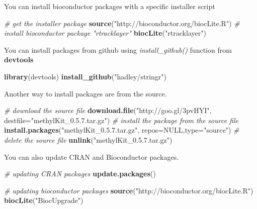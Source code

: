 \documentclass[12pt,]{krantz}
\newenvironment{Shaded}{\begin{snugshade}}{\end{snugshade}}
\newcommand{\CommentTok}[1]{\textcolor[rgb]{0.56,0.35,0.01}{\textit{#1}}}
\newcommand{\DataTypeTok}[1]{\textcolor[rgb]{0.13,0.29,0.53}{#1}}
\newcommand{\KeywordTok}[1]{\textcolor[rgb]{0.13,0.29,0.53}{\textbf{#1}}}
\newcommand{\NormalTok}[1]{#1}
\newcommand{\OtherTok}[1]{\textcolor[rgb]{0.56,0.35,0.01}{#1}}
\newcommand{\StringTok}[1]{\textcolor[rgb]{0.31,0.60,0.02}{#1}}
\theoremstyle{definition}
\theoremstyle{definition}
\theoremstyle{definition}
\theoremstyle{remark}
\begin{document}
You can install bioconductor packages with a specific installer script

\begin{Shaded}
\begin{Highlighting}[]
\CommentTok{# get the installer package}
\KeywordTok{source}\NormalTok{(}\StringTok{"http://bioconductor.org/biocLite.R"}\NormalTok{)}
\CommentTok{# install bioconductor package "rtracklayer"}
\KeywordTok{biocLite}\NormalTok{(}\StringTok{"rtracklayer"}\NormalTok{)}
\end{Highlighting}
\end{Shaded}

You can install packages from github using \emph{install\_github()}
function from \textbf{devtools}

\begin{Shaded}
\begin{Highlighting}[]
\KeywordTok{library}\NormalTok{(devtools)}
\KeywordTok{install_github}\NormalTok{(}\StringTok{"hadley/stringr"}\NormalTok{)}
\end{Highlighting}
\end{Shaded}

Another way to install packages are from the source.

\begin{Shaded}
\begin{Highlighting}[]
\CommentTok{# download the source file}
\KeywordTok{download.file}\NormalTok{(}\StringTok{"http://goo.gl/3pvHYI"}\NormalTok{,}
               \DataTypeTok{destfile=}\StringTok{"methylKit_0.5.7.tar.gz"}\NormalTok{)}
\CommentTok{# install the package from the source file}
\KeywordTok{install.packages}\NormalTok{(}\StringTok{"methylKit_0.5.7.tar.gz"}\NormalTok{,}
                 \DataTypeTok{repos=}\OtherTok{NULL}\NormalTok{,}\DataTypeTok{type=}\StringTok{"source"}\NormalTok{)}
\CommentTok{# delete the source file}
\KeywordTok{unlink}\NormalTok{(}\StringTok{"methylKit_0.5.7.tar.gz"}\NormalTok{)}
\end{Highlighting}
\end{Shaded}

You can also update CRAN and Bioconductor packages.

\begin{Shaded}
\begin{Highlighting}[]
\CommentTok{# updating CRAN packages}
\KeywordTok{update.packages}\NormalTok{()}

\CommentTok{# updating bioconductor packages}
\KeywordTok{source}\NormalTok{(}\StringTok{"http://bioconductor.org/biocLite.R"}\NormalTok{)}
\KeywordTok{biocLite}\NormalTok{(}\StringTok{"BiocUpgrade"}\NormalTok{)}
\end{Highlighting}
\end{Shaded}
\end{document}
